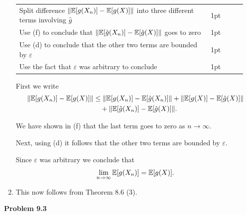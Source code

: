 \begin{enumerate}[label={(\alph*)}]
{	\begin{tabular}{p{0.8\linewidth}p{0.15\linewidth}}
	\hline
	Split difference $\|\bbE[g(X_n)] - \bbE[g(X)]\|$ into three different terms involving $\hat{g}$ & 1pt\\
	Use (f) to conclude that $\|\bbE[\hat{g}(X_n)] - \bbE[\hat{g}(X)]\|$ goes to zero  & 1pt\\
	Use (d) to conclude that the other two terms are bounded by $\varepsilon$ & 1pt\\
	Use the fact that $\varepsilon$ was arbitrary to conclude & 1pt\\
	\hline
	\end{tabular}
	
	}

First we write
\begin{align*}
	\|\bbE[g(X_n)] - \bbE[g(X)]\| &\le \|\bbE[g(X_n)] - \bbE[\hat{g}(X_n)]\| 
		+ \|\bbE[g(X)] - \bbE[\hat{g}(X)]\| \\
	&\hspace{10pt}+ \|\bbE[\hat{g}(X_n)] - \bbE[\hat{g}(X)]\|.
\end{align*}

We have shown in (f) that the last term goes to zero as $n \to \infty$. 

Next, using (d) it follows that the other two terms are bounded by $\varepsilon$.

Since $\varepsilon$ was arbitrary we conclude that
\[
	\lim_{n \to \infty} \bbE[g(X_n)] = \bbE[g(X)].
\]
\item {}  
	
This now follows from Theorem 8.6 (3).
\end{enumerate}

\bigskip

\textbf{Problem 9.3}

